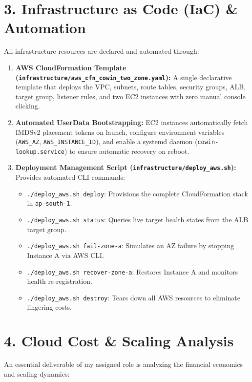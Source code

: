 \documentclass[11pt,a4paper]{article}
\newcommand{\sectionline}[1]{\section*{\color{navy}#1}}
\begin{document}
\sectionline{3. Infrastructure as Code (IaC) \& Automation}
All infrastructure resources are declared and automated through:
\begin{enumerate}
    \item \textbf{AWS CloudFormation Template (\texttt{infrastructure/aws\_cfn\_cowin\_two\_zone.yaml}):} A single declarative template that deploys the VPC, subnets, route tables, security groups, ALB, target group, listener rules, and two EC2 instances with zero manual console clicking.
    \item \textbf{Automated UserData Bootstrapping:} EC2 instances automatically fetch IMDSv2 placement tokens on launch, configure environment variables (\texttt{AWS\_AZ}, \texttt{AWS\_INSTANCE\_ID}), and enable a systemd daemon (\texttt{cowin-lookup.service}) to ensure automatic recovery on reboot.
    \item \textbf{Deployment Management Script (\texttt{infrastructure/deploy\_aws.sh}):} Provides automated CLI commands:
    \begin{itemize}
        \item \texttt{./deploy\_aws.sh deploy}: Provisions the complete CloudFormation stack in \texttt{ap-south-1}.
        \item \texttt{./deploy\_aws.sh status}: Queries live target health states from the ALB target group.
        \item \texttt{./deploy\_aws.sh fail-zone-a}: Simulates an AZ failure by stopping Instance A via AWS CLI.
        \item \texttt{./deploy\_aws.sh recover-zone-a}: Restores Instance A and monitors health re-registration.
        \item \texttt{./deploy\_aws.sh destroy}: Tears down all AWS resources to eliminate lingering costs.
    \end{itemize}
\end{enumerate}

\sectionline{4. Cloud Cost \& Scaling Analysis}
An essential deliverable of my assigned role is analyzing the financial economics and scaling dynamics:
\end{document}
